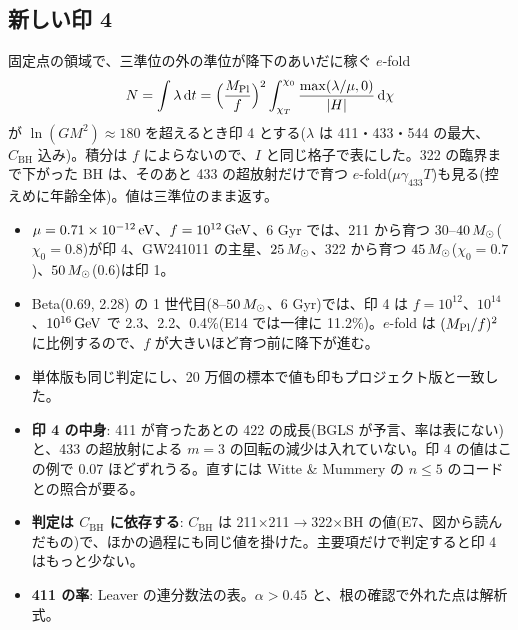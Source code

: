 \subsection{新しい印 4}

固定点の領域で、三準位の外の準位が降下のあいだに稼ぐ $e$-fold
\begin{equation}
N=\int\lambda\,\mathrm{d}t=\Bigl(\frac{M_\mathrm{Pl}}{f}\Bigr)^2\int_{\chi_T}^{\chi_0}\frac{\max(\lambda/\mu,0)}{|H|}\,\mathrm{d}\chi
\end{equation}
が $\ln(GM^2)\approx180$ を超えるとき印 4 とする($\lambda$ は 411・433・544 の最大、$C_\mathrm{BH}$ 込み)。積分は $f$ によらないので、$I$ と同じ格子で表にした。322 の臨界まで下がった BH は、そのあと 433 の超放射だけで育つ $e$-fold($\mu\gamma_{433}T$)も見る(控えめに年齢全体)。値は三準位のまま返す。

\begin{result}
\begin{itemize}
\item $\mu=0.71\times10^{-12}\,\mathrm{eV}$、$f=10^{12}\,\mathrm{GeV}$、6 Gyr では、211 から育つ $30$--$40\,M_\odot$($\chi_0=0.8$)が印 4、GW241011 の主星、$25\,M_\odot$、322 から育つ $45\,M_\odot$($\chi_0=0.7$)、$50\,M_\odot$(0.6)は印 1。
\item Beta(0.69, 2.28) の 1 世代目($8$--$50\,M_\odot$、6 Gyr)では、印 4 は $f=10^{12}$、$10^{14}$、$10^{16}\,\mathrm{GeV}$ で 2.3、2.2、0.4\%(E14 では一律に 11.2\%)。$e$-fold は $(M_\mathrm{Pl}/f)^2$ に比例するので、$f$ が大きいほど育つ前に降下が進む。
\item 単体版も同じ判定にし、20 万個の標本で値も印もプロジェクト版と一致した。
\end{itemize}
\end{result}

\begin{caveat}
\begin{itemize}
\item \textbf{印 4 の中身}: 411 が育ったあとの 422 の成長(BGLS が予言、率は表にない)と、433 の超放射による $m=3$ の回転の減少は入れていない。印 4 の値はこの例で 0.07 ほどずれうる。直すには Witte \& Mummery の $n\le5$ のコードとの照合が要る。
\item \textbf{判定は $C_\mathrm{BH}$ に依存する}: $C_\mathrm{BH}$ は 211$\times$211$\to$322$\times$BH の値(E7、図から読んだもの)で、ほかの過程にも同じ値を掛けた。主要項だけで判定すると印 4 はもっと少ない。
\item \textbf{411 の率}: Leaver の連分数法の表。$\alpha>0.45$ と、根の確認で外れた点は解析式。
\end{itemize}
\end{caveat}
